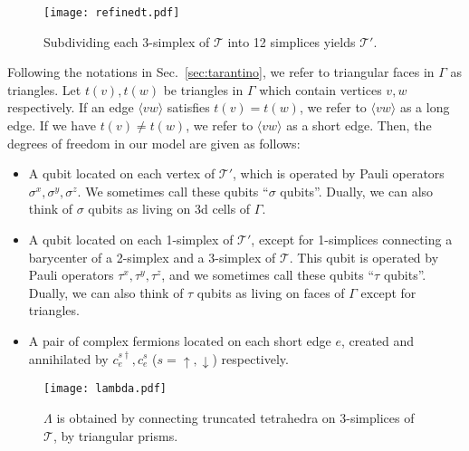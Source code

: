\documentclass[12pt]{article}
\numberwithin{equation}{section}
\begin{document}
\begin{figure}[htb]
\centering
\texttt{[image: refinedt.pdf]}
\caption{Subdividing each 3-simplex of $\mathcal{T}$ into 12 simplices yields $\mathcal{T}'$.}
\label{fig:refined}
\end{figure}

Following the notations in Sec.~\ref{sec:tarantino}, we refer to triangular faces in $\Gamma$ as triangles. Let $t(v), t(w)$ be triangles in $\Gamma$ which contain vertices $v, w$ respectively. If an edge $\langle vw\rangle$ satisfies $t(v)=t(w)$, we refer to $\langle vw\rangle$ as a long edge. If we have $t(v)\neq t(w)$, we refer to $\langle vw\rangle$ as a short edge.
Then, the degrees of freedom in our model are given as follows:
\begin{itemize}
    \item A qubit located on each vertex of $\mathcal{T}'$, which is operated by Pauli operators $\sigma^x, \sigma^y, \sigma^z$.
    We sometimes call these qubits ``$\sigma$ qubits''. Dually, we can also think of $\sigma$ qubits as living on 3d cells of $\Gamma$.
    \item A qubit located on each 1-simplex of $\mathcal{T}'$, except for 1-simplices connecting a barycenter of a 2-simplex and a 3-simplex of $\mathcal{T}$. This qubit is operated by Pauli operators $\tau^x, \tau^y, \tau^z$, and we sometimes call these qubits ``$\tau$ qubits''. Dually, we can also think of $\tau$ qubits as living on faces of $\Gamma$ except for triangles.
    \item A pair of complex fermions located on each short edge $e$, created and annihilated by $c_{e}^{s\dagger}, c_{e}^{s}$ ($s=\uparrow, \downarrow$) respectively.
\end{itemize}

\begin{figure}[htb]
\centering
\texttt{[image: lambda.pdf]}
\caption{$\Lambda$ is obtained by connecting truncated tetrahedra on 3-simplices of $\mathcal{T}$, by triangular prisms.}
\label{fig:lambda}
\end{figure}
\end{document}
